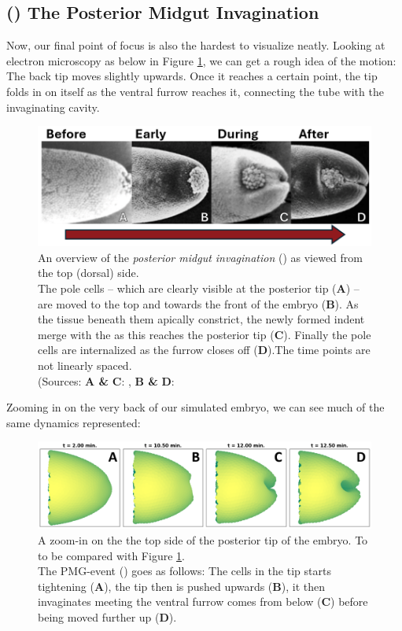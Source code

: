 \subsection{() The Posterior Midgut Invagination }
Now, our final point of focus is also the hardest to visualize neatly. Looking at electron microscopy as below in Figure \ref{fig:PMG-IRL}, we can get a rough idea of the motion:
The back tip moves slightly upwards. Once it reaches a certain point, the tip folds in on itself as the ventral furrow reaches it, connecting the tube with the invaginating cavity.\cite{campos2013embryonic}

\begin{figure}[H]
    \centering
    \includegraphics[width=1.\linewidth]{chapters/Results/figures/4stepPMG_annotated.png}
    \caption{An overview of the \textit{posterior midgut invagination} () as viewed from the top (dorsal) side. \\The pole cells -- which are clearly visible at the posterior tip (\textbf{A}) -- are moved to the top and towards the front of the embryo (\textbf{B}). As the tissue beneath them apically constrict, the newly formed indent merge with the  as this reaches the posterior tip (\textbf{C}). Finally the pole cells are internalized as the furrow closes off (\textbf{D}).The time points are not linearly spaced.\\
    (Sources: \textbf{A \&} \textbf{C}: , \textbf{B \&} \textbf{D}: }
    \label{fig:PMG-IRL}
\end{figure}
Zooming in on the very back of our simulated embryo, we can see much of the same dynamics represented:
\begin{figure}[H]
    \centering
    \includegraphics[width=1.\linewidth]{chapters/Results/figures/VisualPMG.png}
    \caption{A zoom-in on the the top side of the posterior tip of the embryo. To to be compared with Figure \ref{fig:PMG-IRL}. \\The PMG-event () goes as follows: The cells in the tip starts tightening (\textbf{A}), the tip then is pushed upwards (\textbf{B}), it then invaginates meeting the ventral furrow comes from below (\textbf{C}) before being moved further up (\textbf{D}).}
    \label{fig:visual-pmg-external}
\end{figure}

